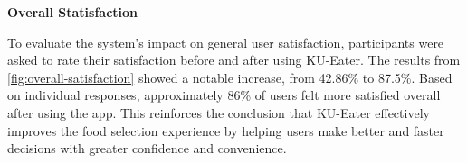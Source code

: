 \textbf{Overall Statisfaction}

To evaluate the system's impact on general user satisfaction,
participants were asked to rate their satisfaction before and after using KU-Eater.
The results from \ref{fig:overall-satisfaction} showed a notable increase, from 42.86\% to 87.5\%.
Based on individual responses, approximately 86\% of users felt more satisfied
overall after using the app. This reinforces the conclusion that KU-Eater effectively
improves the food selection experience by helping users make better and faster decisions
with greater confidence and convenience.